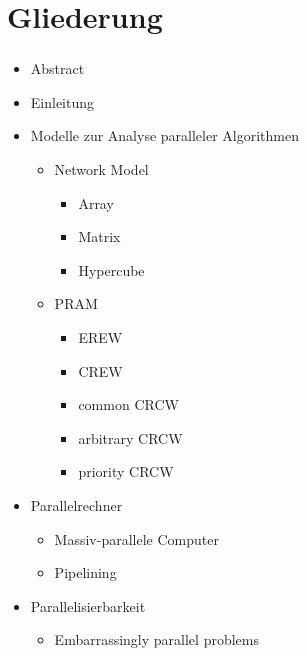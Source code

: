 
\section{Gliederung}
\label{sec:gliederung}

\begin{frame}[allowframebreaks]
    \frametitle{\insertsection}
    \begin{itemize}
        \item Abstract
        \item Einleitung
        \item Modelle zur Analyse paralleler Algorithmen
            \begin{itemize}
                \item Network Model
                    \begin{itemize}
                        \item Array
                        \item Matrix
                        \item Hypercube
                    \end{itemize}
                \item PRAM
                    \begin{itemize}
                        \item EREW
                        \item CREW
                        \item common CRCW
                        \item arbitrary CRCW
                        \item priority CRCW
                    \end{itemize}
            \end{itemize}
        \framebreak
        \item Parallelrechner
            \begin{itemize}
                \item Massiv-parallele Computer
                \item Pipelining
            \end{itemize}
        \item Parallelisierbarkeit
            \begin{itemize}
                \item Embarrassingly parallel problems

\end{itemize}
\end{itemize}
\end{frame}
